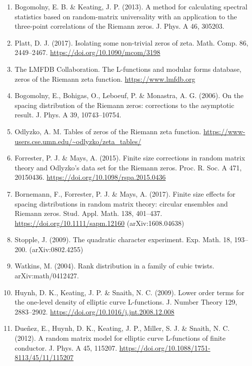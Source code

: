 \documentclass[
  10pt,
]{article}
\begin{document}
\begin{enumerate}
\item
  Bogomolny, E. B. \& Keating, J. P. (2013). A method for calculating
  spectral statistics based on random-matrix universality with an
  application to the three-point correlations of the Riemann zeros. J.
  Phys. A 46, 305203.
\item
  Platt, D. J. (2017). Isolating some non-trivial zeros of zeta. Math.
  Comp. 86, 2449--2467. \url{https://doi.org/10.1090/mcom/3198}
\item
  The LMFDB Collaboration. The L-functions and modular forms database,
  zeros of the Riemann zeta function. \url{https://www.lmfdb.org}
\item
  Bogomolny, E., Bohigas, O., Leboeuf, P. \& Monastra, A. G. (2006). On
  the spacing distribution of the Riemann zeros: corrections to the
  asymptotic result. J. Phys. A 39, 10743--10754.
\item
  Odlyzko, A. M. Tables of zeros of the Riemann zeta function.
  \url{https://www-users.cse.umn.edu/~odlyzko/zeta_tables/}
\item
  Forrester, P. J. \& Mays, A. (2015). Finite size corrections in random
  matrix theory and Odlyzko's data set for the Riemann zeros. Proc. R.
  Soc. A 471, 20150436. \url{https://doi.org/10.1098/rspa.2015.0436}
\item
  Bornemann, F., Forrester, P. J. \& Mays, A. (2017). Finite size
  effects for spacing distributions in random matrix theory: circular
  ensembles and Riemann zeros. Stud. Appl. Math. 138, 401--437.
  \url{https://doi.org/10.1111/sapm.12160} (arXiv:1608.04638)
\item
  Stopple, J. (2009). The quadratic character experiment. Exp. Math. 18,
  193--200. (arXiv:0802.4255)
\item
  Watkins, M. (2004). Rank distribution in a family of cubic twists.
  arXiv:math/0412427.
\item
  Huynh, D. K., Keating, J. P. \& Snaith, N. C. (2009). Lower order
  terms for the one-level density of elliptic curve L-functions. J.
  Number Theory 129, 2883--2902.
  \url{https://doi.org/10.1016/j.jnt.2008.12.008}
\item
  Dueñez, E., Huynh, D. K., Keating, J. P., Miller, S. J. \& Snaith, N.
  C. (2012). A random matrix model for elliptic curve L-functions of
  finite conductor. J. Phys. A 45, 115207.
  \url{https://doi.org/10.1088/1751-8113/45/11/115207}
\end{enumerate}
\end{document}
